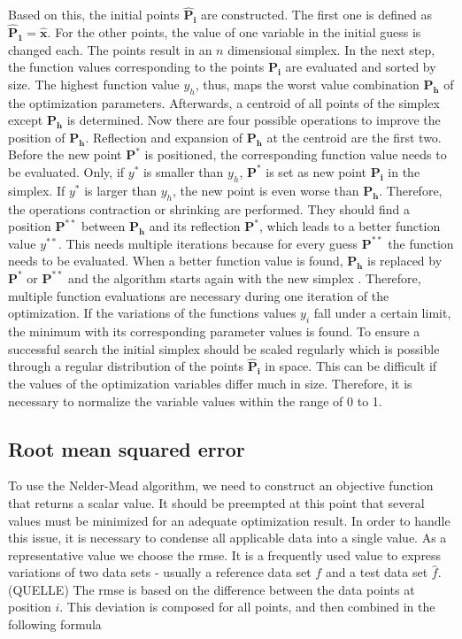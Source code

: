 Based on this, the initial points $\mathbf{\hat{P}_i}$ are constructed. The first one is defined as $\mathbf{\hat{P}_1} = \mathbf{\hat{x}}$. For the other points, the value of one variable in the initial guess is changed each. The points result in an $n$ dimensional simplex. In the next step, the function values corresponding to the points $\mathbf{P_i}$ are evaluated and sorted by size. The highest function value $y_h$, thus, maps the worst value combination $\mathbf{P_h}$ of the optimization parameters. Afterwards, a centroid of all points of the simplex except $\mathbf{P_h}$ is determined. Now there are four possible operations to improve the position of $\mathbf{P_h}$. Reflection and expansion of $\mathbf{P_h}$ at the centroid are the first two. Before the new point $\mathbf{P^{*}}$ is positioned, the corresponding function value needs to be evaluated. Only, if $y^{*}$ is smaller than $y_h$, $\mathbf{P^{*}}$ is set as new point $\mathbf{P_i}$ in the simplex. If $y^{*}$ is larger than $y_h$, the new point is even worse than $\mathbf{P_h}$. Therefore, the operations contraction or shrinking are performed. They should find a position $\mathbf{P^{**}}$ between $\mathbf{P_h}$ and its reflection $\mathbf{P^{*}}$, which leads to a better function value $y^{**}$. This needs multiple iterations because for every guess $\mathbf{P^{**}}$ the function needs to be evaluated. When a better function value is found, $\mathbf{P_h}$ is replaced by $\mathbf{P^{*}}$ or $\mathbf{P^{**}}$ and the algorithm starts again with the new simplex \cite{nelder_simplex_1965}. Therefore, multiple function evaluations are necessary during one iteration of the optimization. If the variations of the functions values $y_i$ fall under a certain limit, the minimum with its corresponding parameter values is found. To ensure a successful search the initial simplex should be scaled regularly \cite{baudin_nelder-mead_nodate} which is possible through a regular distribution of the points $\mathbf{\hat{P}_i}$ in space. This can be difficult if the values of the optimization variables differ much in size. Therefore, it is necessary to normalize the variable values within the range of 0 to 1.

\subsection{Root mean squared error} \label{subsec: RMSE}
To use the Nelder-Mead algorithm, we need to construct an objective function that returns a scalar value. It should be preempted at this point that several values must be minimized for an adequate optimization result. In order to handle this issue, it is necessary to condense all applicable data into a single value. As a representative value we choose the \acrfull{rmse}. It is a frequently used value to express variations of two data sets - usually a reference data set $f$ and a test data set $\hat{f}$. (QUELLE) The \acrshort{rmse} is based on the difference between the data points at position $i$. This deviation is composed for all points, and then combined in the following formula


